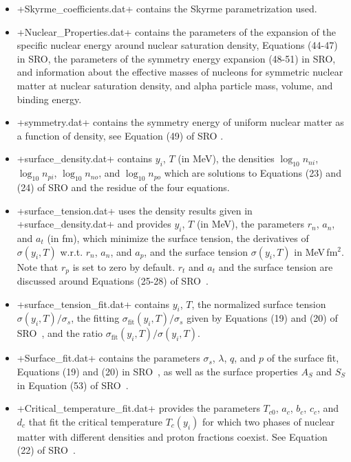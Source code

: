 \documentclass[letterpaper,11pt]{refart}
\begin{document}
\begin{itemize}
 \item \verbfile+Skyrme_coefficients.dat+ contains the Skyrme
   parametrization used.

 \item \verbfile+Nuclear_Properties.dat+ contains the parameters of 
   the expansion of the specific nuclear energy around nuclear saturation 
   density, Equations (44-47) in SRO, the parameters of the symmetry energy 
   expansion (48-51) in SRO, and information about the effective masses of 
   nucleons for symmetric nuclear matter at nuclear saturation density, 
   and alpha particle mass, volume, and binding energy.
    
 \item \verbfile+symmetry.dat+ contains the symmetry energy of uniform
   nuclear matter as a function of density, see Equation (49) of SRO
   \cite{schneider:17}.

 \item \verbfile+surface_density.dat+ contains $y_i$, $T$ (in MeV), the
   densities $\log_{10}n_{ni}$, $\log_{10}n_{pi}$, $\log_{10}n_{no}$,
   and $\log_{10}n_{po}$ which are solutions to Equations (23) and (24) of
   SRO \cite{schneider:17} and the residue of the four equations.

 \item \verbfile+surface_tension.dat+ uses the density results given
   in \verbfile+surface_density.dat+ and provides $y_i$, $T$ (in MeV),
   the parameters $r_n$, $a_n$, and $a_t$ (in fm), which minimize the
   surface tension, the derivatives of $\sigma(y_i,T)$ w.r.t. $r_n$,
   $a_n$, and $a_p$, and the surface tension $\sigma(y_i,T)$ in
   MeV\,fm$^2$. Note that $r_p$ is set to zero by default. $r_t$ and
   $a_t$ and the surface tension are discussed around Equations (25-28)
   of SRO~\cite{schneider:17}.

 \item \verbfile+surface_tension_fit.dat+ contains $y_i$, $T$, the
   normalized surface tension $\sigma(y_i,T)/\sigma_s$, the fitting
   $\sigma_{\mathrm{fit}}(y_i,T)/\sigma_s$ given by Equations (19) and
   (20) of SRO~\cite{schneider:17}, and the ratio
   $\sigma_{\mathrm{fit}}(y_i,T)/\sigma(y_i,T)$.

 \item \verbfile+Surface_fit.dat+ contains the parameters $\sigma_s$,
   $\lambda$, $q$, and $p$ of the surface fit, Equations (19) and (20)
   in SRO~\cite{schneider:17}, as well as the surface properties $A_S$
   and $S_S$ in Equation (53) of SRO~\cite{schneider:17}.

 \item \verbfile+Critical_temperature_fit.dat+ provides the parameters
   $T_{c0}$, $a_c$, $b_c$, $c_c$, and $d_c$ that fit the critical
   temperature $T_c(y_i)$ for which two phases of nuclear matter with
   different densities and proton fractions coexist. See Equation (22) of
   SRO~\cite{schneider:17}.

\end{itemize}
\end{document}
